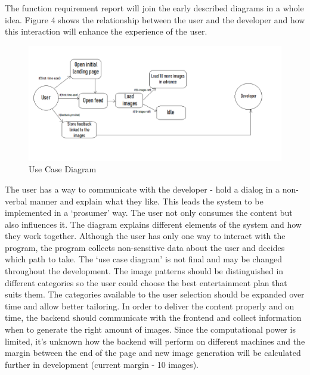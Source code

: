\documentclass[12pt]{report}
\begin{document}
    The function requirement report will join the early described diagrams in a whole idea. Figure 4 shows the relationship between the user and the developer and how this interaction will enhance the experience of the user.

    \begin{figure}[htbp]
        \centerline{\includegraphics[scale=.5]{img/use-case-diagram.png}}
        \label{use_case_diagram}
        \caption{Use Case Diagram}
    \end{figure}

    The user has a way to communicate with the developer - hold a dialog in a non-verbal manner and explain what they like. This leads the system to be implemented in a `prosumer' way. The user not only consumes the content but also influences it. 
    The diagram explains different elements of the system and how they work together. Although the user has only one way to interact with the program, the program collects non-sensitive data about the user and decides which path to take. The `use case diagram' is not final and may be changed throughout the development.
    The image patterns should be distinguished in different categories so the user could choose the best entertainment plan that suits them. The categories available to the user selection should be expanded over time and allow better tailoring.
    In order to deliver the content properly and on time, the backend should communicate with the frontend and collect information when to generate the right amount of images. Since the computational power is limited, it's unknown how the backend will perform on different machines and the margin between the end of the page and new image generation will be calculated further in development (current margin - 10 images).

    \clearpage
\end{document}

